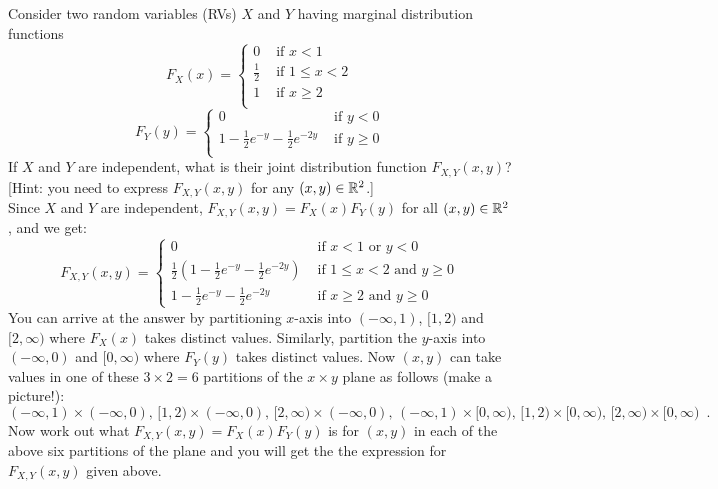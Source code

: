 \begin{ExerciseList}
\Exercise
Consider two random variables (RVs) $X$ and $Y$ having marginal distribution functions
\[
F_X(x) =
\begin{cases}
0 & \text{ if } x < 1\\
\frac{1}{2} & \text{ if } 1 \leq x < 2\\
1 & \text{ if } x \geq 2\\
\end{cases}
\] 
\[
F_Y(y) =
\begin{cases}
0 & \text{ if } y < 0\\
1-\frac{1}{2}e^{-y}-\frac{1}{2}e^{-2y} & \text{ if } y \geq 0\\
\end{cases}
\]
If $X$ and $Y$ are independent, what is their joint distribution function $F_{X,Y}(x,y)$? [Hint: you need to express $F_{X,Y}(x,y)$ for any $(x,y) \in \mathbb{R}^2$.]
\Answer
~\\
Since $X$ and $Y$ are independent, $F_{X,Y}(x,y) = F_X(x) F_Y(y)$ for all $(x,y) \in \mathbb{R}^2$, and we get:
\[
F_{X,Y}(x,y) = 
\begin{cases}
0 & \text{ if } x < 1 \text{ or } y < 0\\
\frac{1}{2}\left(1-\frac{1}{2}e^{-y}-\frac{1}{2}e^{-2y}\right) & \text{ if } 1 \leq x < 2 \text{ and } y \geq 0\\
1-\frac{1}{2}e^{-y}-\frac{1}{2}e^{-2y} & \text{ if } x \geq 2 \text{ and } y \geq 0
\end{cases}
\]
{\small
You can arrive at the answer by partitioning $x$-axis into $(-\infty,1)$, $[1,2)$ and $[2,\infty)$ where $F_X(x)$ takes distinct values.  Similarly, partition the $y$-axis into  $(-\infty,0)$ and $[0,\infty)$ where $F_Y(y)$ takes distinct values.  
Now $(x,y)$ can take values in one of these $3 \times 2=6$ partitions of the $x \times y$ plane as follows (make a picture!):
\[
(-\infty,1) \times (-\infty,0), \,
[1,2) \times (-\infty,0), \,
[2,\infty) \times (-\infty,0), \,
(-\infty,1) \times [0,\infty), \,
[1,2) \times [0,\infty), \,
[2,\infty) \times [0,\infty) \enspace .
\]
Now work out what $F_{X,Y}(x,y) = F_X(x) F_Y(y)$ is for $(x,y)$ in each of the above six partitions of the plane and you will get the the expression for $F_{X,Y}(x,y)$ given above.
}


\end{ExerciseList}
